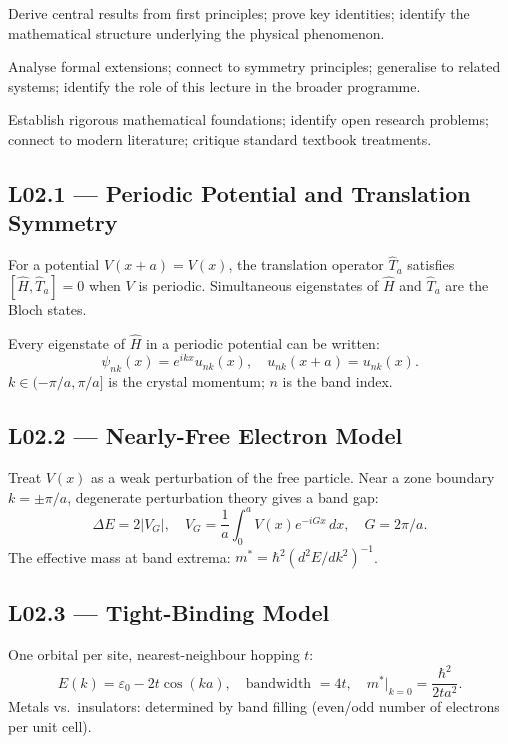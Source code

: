 \quad
Derive central results from first principles; prove key identities; identify
the mathematical structure underlying the physical phenomenon.

\quad
Analyse formal extensions; connect to symmetry principles; generalise to
related systems; identify the role of this lecture in the broader programme.

\quad
Establish rigorous mathematical foundations; identify open research problems;
connect to modern literature; critique standard textbook treatments.


\subsection*{L02.1 — Periodic Potential and Translation Symmetry}
For a potential $V(x+a)=V(x)$, the translation operator $\hat{T}_a$ satisfies
$[\hat{H},\hat{T}_a]=0$ when $V$ is periodic. Simultaneous eigenstates of $\hat{H}$
and $\hat{T}_a$ are the Bloch states.

\begin{tcolorbox}[lecturebox, title={Bloch's Theorem}]
Every eigenstate of $\hat{H}$ in a periodic potential can be written:
\begin{equation}
  \psi_{nk}(x) = e^{ikx}u_{nk}(x), \quad u_{nk}(x+a) = u_{nk}(x).
  \label{eq:L02.1}
\end{equation}
$k\in(-\pi/a,\pi/a]$ is the crystal momentum; $n$ is the band index.
\end{tcolorbox}

\subsection*{L02.2 — Nearly-Free Electron Model}
Treat $V(x)$ as a weak perturbation of the free particle. Near a zone boundary $k=\pm\pi/a$,
degenerate perturbation theory gives a band gap:
\begin{equation}
  \Delta E = 2|V_G|, \quad V_G = \frac{1}{a}\int_0^a V(x)e^{-i G x}\,dx, \quad G=2\pi/a.
  \label{eq:L02.2}
\end{equation}
The effective mass at band extrema: $m^* = \hbar^2(d^2E/dk^2)^{-1}$.

\subsection*{L02.3 — Tight-Binding Model}
One orbital per site, nearest-neighbour hopping $t$:
\begin{equation}
  E(k) = \varepsilon_0 - 2t\cos(ka), \quad \text{bandwidth } = 4t, \quad
  m^*\big|_{k=0} = \frac{\hbar^2}{2ta^2}.
  \label{eq:L02.3}
\end{equation}
Metals vs.\ insulators: determined by band filling (even/odd number of electrons per unit cell).


